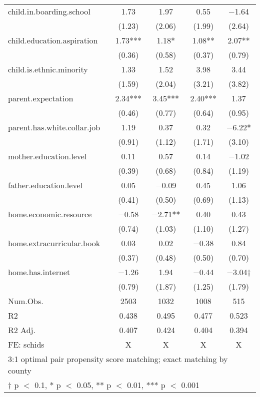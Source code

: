\documentclass[
  man,floatsintext]{apa7}
\begin{document}
\begin{table}
\begin{tabular}[t]{lcccc}
child.in.boarding.school & \num{1.73} & \num{1.97} & \num{0.55} & \num{-1.64}\\
 & (\num{1.23}) & (\num{2.06}) & (\num{1.99}) & (\num{2.64})\\
child.education.aspiration & \num{1.73}*** & \num{1.18}* & \num{1.08}** & \num{2.07}**\\
 & (\num{0.36}) & (\num{0.58}) & (\num{0.37}) & (\num{0.79})\\
child.is.ethnic.minority & \num{1.33} & \num{1.52} & \num{3.98} & \num{3.44}\\
 & (\num{1.59}) & (\num{2.04}) & (\num{3.21}) & (\num{3.82})\\
parent.expectation & \num{2.34}*** & \num{3.45}*** & \num{2.40}*** & \num{1.37}\\
 & (\num{0.46}) & (\num{0.77}) & (\num{0.64}) & (\num{0.95})\\
parent.has.white.collar.job & \num{1.19} & \num{0.37} & \num{0.32} & \num{-6.22}*\\
 & (\num{0.91}) & (\num{1.12}) & (\num{1.71}) & (\num{3.10})\\
mother.education.level & \num{0.11} & \num{0.57} & \num{0.14} & \num{-1.02}\\
 & (\num{0.39}) & (\num{0.68}) & (\num{0.84}) & (\num{1.19})\\
father.education.level & \num{0.05} & \num{-0.09} & \num{0.45} & \num{1.06}\\
 & (\num{0.41}) & (\num{0.50}) & (\num{0.69}) & (\num{1.13})\\
home.economic.resource & \num{-0.58} & \num{-2.71}** & \num{0.40} & \num{0.43}\\
 & (\num{0.74}) & (\num{1.03}) & (\num{1.10}) & (\num{1.27})\\
home.extracurricular.book & \num{0.03} & \num{0.02} & \num{-0.38} & \num{0.84}\\
 & (\num{0.37}) & (\num{0.48}) & (\num{0.50}) & (\num{0.70})\\
home.has.internet & \num{-1.26} & \num{1.94} & \num{-0.44} & \num{-3.04}†\\
 & (\num{0.79}) & (\num{1.87}) & (\num{1.25}) & (\num{1.79})\\
\midrule
Num.Obs. & \num{2503} & \num{1032} & \num{1008} & \num{515}\\
R2 & \num{0.438} & \num{0.495} & \num{0.477} & \num{0.523}\\
R2 Adj. & \num{0.407} & \num{0.424} & \num{0.404} & \num{0.394}\\
FE: schids & X & X & X & X\\
\bottomrule
\multicolumn{5}{l}{\rule{0pt}{1em}3:1 optimal pair propensity score matching; exact matching by county}\\
\multicolumn{5}{l}{\rule{0pt}{1em}† p $<$ 0.1, * p $<$ 0.05, ** p $<$ 0.01, *** p $<$ 0.001}\\
\end{tabular}
\end{table}
\end{document}
